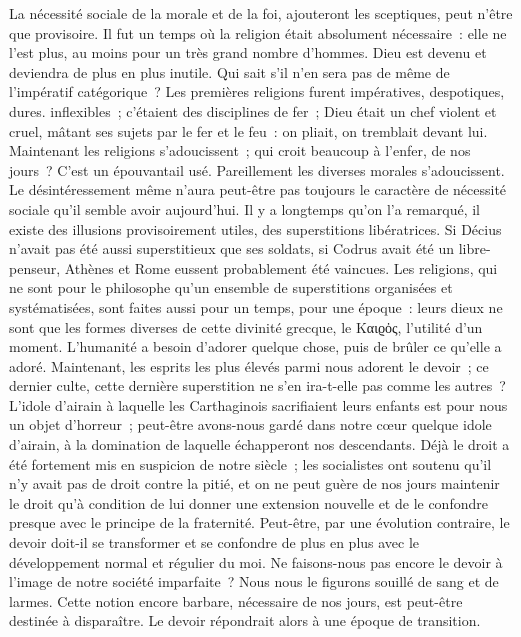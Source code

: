 \documentclass[french,twoside]{book} %
\begin{document}
La nécessité sociale de la morale et de la foi, ajouteront les sceptiques, peut n’être que provisoire. Il fut un temps où la religion était absolument nécessaire : elle ne l’est plus, au moins pour un très grand nombre d’hommes. Dieu est devenu et deviendra de plus en plus inutile. Qui sait s’il n’en sera pas de même de l’impératif catégorique ? Les premières religions furent impératives, despotiques, dures. inflexibles ; c’étaient des disciplines de fer ; Dieu était un chef violent et cruel, mâtant ses sujets par le fer et le feu : on pliait, on tremblait devant lui. Maintenant les religions s’adoucissent ; qui croit beaucoup à l’enfer, de nos jours ? C’est un épouvantail usé. Pareillement les diverses morales s’adoucissent. Le désintéressement même n’aura peut-être pas toujours le caractère de nécessité sociale qu’il semble avoir aujourd’hui. Il y a longtemps qu’on l’a remarqué, il existe des illusions provisoirement utiles, des superstitions libératrices. Si Décius n’avait pas été aussi superstitieux que ses soldats, si Codrus avait été un libre-penseur, Athènes et Rome eussent probablement été vaincues. Les religions, qui ne sont pour le philosophe qu’un ensemble de superstitions organisées et systématisées, sont faites aussi pour un temps, pour une époque : leurs dieux ne sont que les formes diverses de cette divinité grecque, le Καιϱὀς, l’utilité d’un moment. L’humanité a besoin d’adorer quelque chose, puis de brûler ce qu’elle a adoré. Maintenant, les esprits les plus élevés parmi nous adorent le devoir ; ce dernier culte, cette dernière superstition ne s’en ira-t-elle pas comme les autres ? L’idole d’airain à laquelle les Carthaginois sacrifiaient leurs enfants est pour nous un objet d’horreur ; peut-être avons-nous gardé dans notre cœur quelque idole d’airain, à la domination de laquelle échapperont nos descendants. Déjà le droit a été fortement mis en suspicion de notre siècle ; les socialistes ont soutenu qu’il n’y avait pas de droit contre la pitié, et on ne peut guère de nos jours maintenir le droit qu’à condition de lui donner une extension nouvelle et de le confondre presque avec le principe de la fraternité. Peut-être, par une évolution contraire, le devoir doit-il se transformer et se confondre de plus en plus avec le développement normal et régulier du moi. Ne faisons-nous pas encore le devoir à l’image de notre société imparfaite ? Nous nous le figurons souillé de sang et de larmes. Cette notion encore barbare, nécessaire de nos jours, est peut-être destinée à disparaître. Le devoir répondrait alors à une époque de transition.\par
\end{document}
